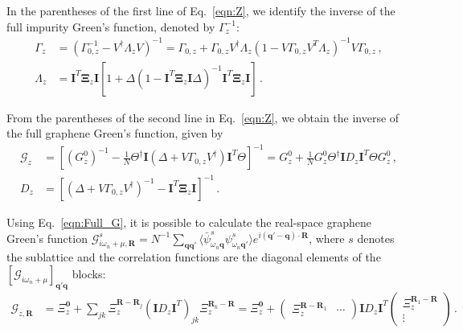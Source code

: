\documentclass[aps, prb, superscriptaddress, preprint, floatfix]{revtex4-1}
\begin{document}
In the parentheses of the first line of Eq.~\eqref{eqn:Z}, we identify the inverse of the full impurity Green's function, denoted by $\Gamma^{-1}_{z}$:
%
\begin{align}
	\Gamma_{z} & = \left(
    \Gamma^{-1}_{0,z}
    - 
   V^\dagger\Lambda_{z}V
	\right)^{-1}
	=
	\Gamma_{0,z}
	+
	\Gamma_{0,z}
    V^\dagger\Lambda_{z}
	\left(
	1
     - V
    \Gamma_{0,z}
    V^T\Lambda_{z}
	\right)^{-1}V\Gamma_{0,z}
	\,,
    \label{eqn:Gamma}
    \\
    \Lambda_{z} &=
    \mathbf{I}^T\boldsymbol{\Xi}_{z}\mathbf{I}
	\left[1+
    \Delta
	\left( 1
	-
	\mathbf{I}^T\boldsymbol{\Xi}_{z}\mathbf{I}\Delta 
	\right)^{-1} \mathbf{I}^T\boldsymbol{\Xi}_{z}\mathbf{I}
	\right]\,.
	\label{eqn:Lambda}
\end{align}
%

From the parentheses of the second line in Eq.~\eqref{eqn:Z}, we obtain the inverse of the full graphene Green's function, given by
%
\begin{align}
	 \mathcal{G}_{z} & =\left[\left(G_{z}^0\right)^{-1} - \frac{1}{N} \Theta^\dagger\mathbf{I}\left(\Delta + V\Gamma_{0,z}V^\dagger
	 \right)\mathbf{I}^T\Theta
	 \right]^{-1}=
	 G_{z}^0+
	  \frac{1}{N} G_{z}^0\Theta^\dagger\mathbf{I} 
	 D_{z}
	 \mathbf{I}^T\Theta
	 G_{z}^0\,,
	 \label{eqn:Full_G}
	 \\
	 D_{z} &=\left[
	\left(\Delta + V\Gamma_{0,z}V^\dagger
	 \right)^{-1}
	 -
	\mathbf{I}^T
	\boldsymbol{\Xi}_{z} \mathbf{I}
	 \right]^{-1}\,.
	 \label{eqn:D}
\end{align}
%

Using Eq.~\eqref{eqn:Full_G}, it is possible to calculate the real-space graphene Green's function $\mathcal{G}_{i\omega_n + \mu,\mathbf{R}}^s = N^{-1}\sum_{\mathbf{qq}'} \langle \bar{\psi}^s_{\omega_n\mathbf{q}}\psi^s_{\omega_n\mathbf{q}'}\rangle e^{i\left(\mathbf{q}'-\mathbf{q}\right)\cdot\mathbf{R}}$, where $s$ denotes the sublattice and the correlation functions are the diagonal elements of the $\left[\mathcal{G}_{i\omega_n+\mu} \right]_{\mathbf{q}'\mathbf{q}}$ blocks:
%
\begin{align}
	\mathcal{G}_{z,\mathbf{R}} 
	 &=\Xi^\mathbf{0}_{z}
	 +
	\sum_{jk}
	\Xi_{z}^{\mathbf{R} - \mathbf{R}_j}
	  \left(\mathbf{I} 
	 D_{z}
	 \mathbf{I}^T
	 \right)_{jk}
	 \Xi_{z}^{\mathbf{R}_k - \mathbf{R}}
	 =\Xi^\mathbf{0}_{z}
	 +
	 \begin{pmatrix}
	 	\Xi_{z}^{\mathbf{R} - \mathbf{R}_1} & \cdots
	 \end{pmatrix}
	 \mathbf{I} 
	 D_{z}
	 \mathbf{I}^T
	 \begin{pmatrix}
	 	\Xi_{z}^{\mathbf{R}_1 - \mathbf{R}} \\ \vdots
	 \end{pmatrix}\,.
	 \label{eqn:Full_G_Real}
\end{align}
%
\end{document}
